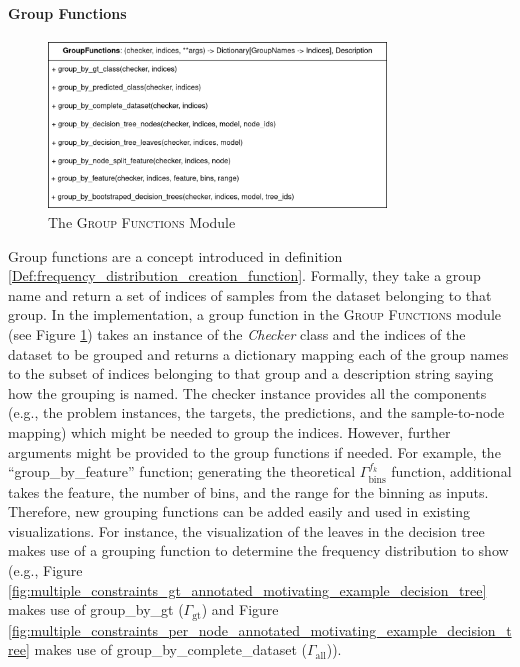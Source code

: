 \paragraph{Group Functions} 
\begin{figure}
    \centering
    \includegraphics[width=0.8\textwidth]{images/implementation/group_functions.png}
    \caption{The \textsc{Group Functions} Module}
    \label{fig:the_group_functions_module}
\end{figure}
Group functions are a concept introduced in definition \ref{Def:frequency_distribution_creation_function}. Formally, they take a group name and return a set of indices of samples from the dataset belonging to that group. In the implementation, a group function in the \textsc{Group Functions} module (see Figure \ref{fig:the_group_functions_module}) takes an instance of the \emph{Checker} class and the indices of the dataset to be grouped and returns a dictionary mapping each of the group names to the subset of indices belonging to that group and a description string saying how the grouping is named. The checker instance provides all the components (e.g., the problem instances, the targets, the predictions, and the sample-to-node mapping) which might be needed to group the indices. However, further arguments might be provided to the group functions if needed. For example, the ``group\_by\_feature'' function; generating the theoretical $\Gamma_\text{bins}^{f_k}$ function, additional takes the feature, the number of bins, and the range for the binning as inputs. Therefore, new grouping functions can be added easily and used in existing visualizations. For instance, the visualization of the leaves in the decision tree makes use of a grouping function to determine the frequency distribution to show (e.g., Figure \ref{fig:multiple_constraints_gt_annotated_motivating_example_decision_tree} makes use of group\_by\_gt ($\Gamma_\text{gt}$) and Figure \ref{fig:multiple_constraints_per_node_annotated_motivating_example_decision_tree} makes use of group\_by\_complete\_dataset ($\Gamma_\text{all}$)).

